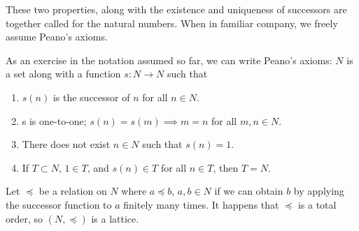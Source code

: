 These two properties, along with the existence
and uniqueness of successors are together called
 for the natural numbers.
When in familiar company, we freely assume Peano's axioms.


As an exercise in the notation assumed so far, we can write Peano's axioms: $N$ is a set along with a function $s: N \to N$ such that
\begin{enumerate}
  \item $s(n)$ is the successor of $n$ for all $n \in N$.
  \item s is one-to-one; $s(n) = s(m) \implies m = n$  for all $m, n \in N$.
  \item There does not exist $n \in N$ such that $s(n) = 1$.
  \item If $T \subset N$, $1 \in T$, and $s(n) \in T$ for all $n \in T$, then $T = N$.
\end{enumerate}


Let $\preceq$ be a relation on $N$ where $a \preceq b$, $a, b \in N$ if we can obtain $b$ by applying the successor function to $a$ finitely many times.
It happens that $\preceq$ is a total order, so $(N, \preceq)$ is a lattice.

\strats
